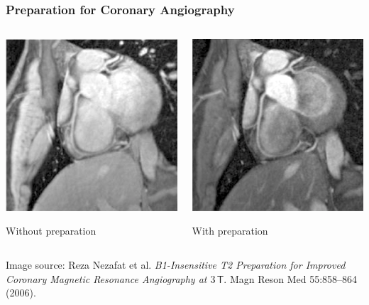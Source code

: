 \begin{frame}
	\frametitle{\transtime{} Preparation for Coronary Angiography}
	
	\begin{columns}[onlytextwidth,c]
		\begin{center}
			\includegraphics[width=.65\linewidth]{images/without_t2prep}
			
			Without \transtime{} preparation
		\end{center}
		
		\begin{center}
			\includegraphics[width=.65\linewidth]{images/with_t2prep}
			
			With \transtime{} preparation
		\end{center}
	\end{columns}
	
	\vspace{1ex}
	
	{\scriptsize Image source: Reza Nezafat et al. \emph{B1-Insensitive T2 Preparation for Improved Coronary Magnetic Resonance Angiography at $3\,\textsf{T}$}. Magn Reson Med 55:858–864 (2006).}
\end{frame}

